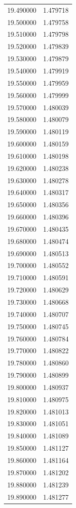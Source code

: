 \begin{tabular}{rr}
19.490000 & 1.479718 \\
19.500000 & 1.479758 \\
19.510000 & 1.479798 \\
19.520000 & 1.479839 \\
19.530000 & 1.479879 \\
19.540000 & 1.479919 \\
19.550000 & 1.479959 \\
19.560000 & 1.479999 \\
19.570000 & 1.480039 \\
19.580000 & 1.480079 \\
19.590000 & 1.480119 \\
19.600000 & 1.480159 \\
19.610000 & 1.480198 \\
19.620000 & 1.480238 \\
19.630000 & 1.480278 \\
19.640000 & 1.480317 \\
19.650000 & 1.480356 \\
19.660000 & 1.480396 \\
19.670000 & 1.480435 \\
19.680000 & 1.480474 \\
19.690000 & 1.480513 \\
19.700000 & 1.480552 \\
19.710000 & 1.480591 \\
19.720000 & 1.480629 \\
19.730000 & 1.480668 \\
19.740000 & 1.480707 \\
19.750000 & 1.480745 \\
19.760000 & 1.480784 \\
19.770000 & 1.480822 \\
19.780000 & 1.480860 \\
19.790000 & 1.480899 \\
19.800000 & 1.480937 \\
19.810000 & 1.480975 \\
19.820000 & 1.481013 \\
19.830000 & 1.481051 \\
19.840000 & 1.481089 \\
19.850000 & 1.481127 \\
19.860000 & 1.481164 \\
19.870000 & 1.481202 \\
19.880000 & 1.481239 \\
19.890000 & 1.481277 \\

\end{tabular}
